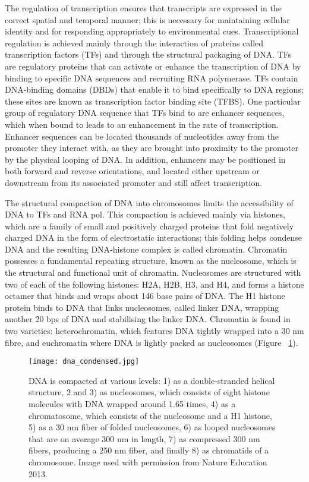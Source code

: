 The regulation of transcription ensures that transcripts are expressed in the correct spatial and temporal manner; this is necessary for maintaining cellular identity and for responding appropriately to environmental cues. Transcriptional regulation is achieved mainly through the interaction of proteins called transcription factors (TFs) and through the structural packaging of DNA. TFs are regulatory proteins that can activate or enhance the transcription of DNA by binding to specific DNA sequences and recruiting RNA polymerase\cite{pmid11092823}. TFs contain DNA-binding domains (DBDs) that enable it to bind specifically to DNA regions; these sites are known as transcription factor binding site (TFBS). One particular group of regulatory DNA sequence that TFs bind to are enhancer sequences, which when bound to leads to an enhancement in the rate of transcription. Enhancer sequences can be located thousands of nucleotides away from the promoter they interact with, as they are brought into proximity to the promoter by the physical looping of DNA. In addition, enhancers may be positioned in both forward and reverse orientations, and located either upstream or downstream from its associated promoter and still affect transcription.

The structural compaction of DNA into chromosomes limits the accessibility of DNA to TFs and RNA pol. This compaction is achieved mainly via histones, which are a family of small and positively charged proteins that fold negatively charged DNA in the form of electrostatic interactions; this folding helps condense DNA and the resulting DNA-histone complex is called chromatin. Chromatin possesses a fundamental repeating structure\cite{holde01111974}, known as the nucleosome, which is the structural and functional unit of chromatin. Nucleosomes are structured with two of each of the following histones: H2A, H2B, H3, and H4, and forms a histone octamer that binds and wraps about 146 base pairs of DNA. The H1 histone protein binds to DNA that links nucleosomes, called linker DNA, wrapping another 20 bps of DNA and stabilising the linker DNA. Chromatin is found in two varieties: heterochromatin, which features DNA tightly wrapped into a 30 nm fibre, and euchromatin where DNA is lightly packed as nucleosomes (Figure ~\ref{fig:dna_condensed}).

\begin{figure}[!ht]
   \centering
   \texttt{[image: dna\_condensed.jpg]}
   \caption[DNA packaging]{DNA is compacted at various levels: 1) as a double-stranded helical structure, 2 and 3) as nucleosomes, which consists of eight histone molecules with DNA wrapped around 1.65 times, 4) as a chromatosome, which consists of the nucleosome and a H1 histone, 5) as a 30 nm fiber of folded nucleosomes, 6) as looped nucleosomes that are on average 300 nm in length, 7) as compressed 300 nm fibers, producing a 250 nm fiber, and finally 8) as chromatids of a chromosome. Image used with permission from Nature Education 2013.}
   \label{fig:dna_condensed}
\end{figure}

